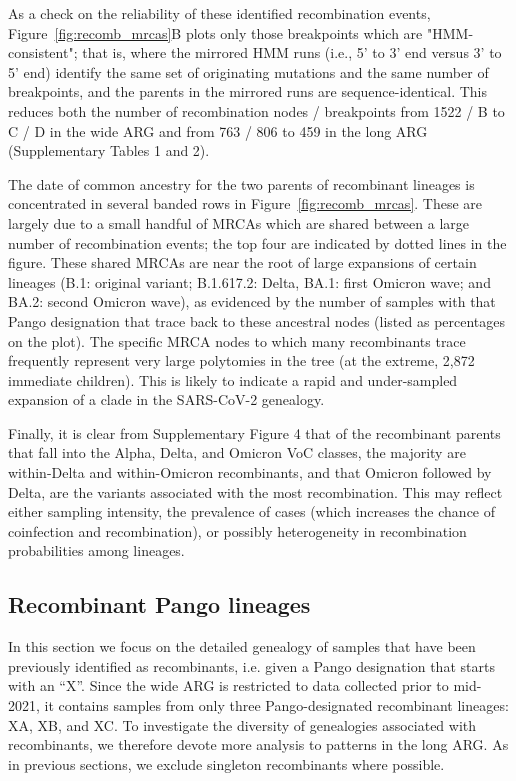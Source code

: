 \documentclass{article}
\begin{document}
As a check on the reliability of these identified recombination events, Figure~\ref{fig:recomb_mrcas}B  plots only those breakpoints which are "HMM-consistent"; that is, where the mirrored HMM runs (i.e., 5’ to 3’ end versus 3’ to 5’ end) identify the same set of originating mutations and the same number of breakpoints, and the parents in the mirrored runs are sequence-identical. This reduces both the number of recombination nodes / breakpoints from 1522 / B to C / D in the wide ARG and from 763 / 806 to 459 in the long ARG (Supplementary Tables 1 and 2).

The date of common ancestry for the two parents of recombinant lineages is concentrated in several banded rows in Figure~\ref{fig:recomb_mrcas}. These are largely due to a small handful of MRCAs which are shared between a large number of recombination events; the top four are indicated by dotted lines in the figure. These shared MRCAs are near the root of large expansions of certain lineages (B.1: original variant;  B.1.617.2: Delta, BA.1: first Omicron wave; and BA.2: second Omicron wave), as evidenced by the number of samples with that Pango designation that trace back to these ancestral nodes (listed as percentages on the plot). The specific MRCA nodes to which many recombinants trace frequently represent very large polytomies in the tree (at the extreme, 2,872 immediate children). This is likely to indicate a rapid and under-sampled expansion of a clade in the SARS-CoV-2 genealogy.

Finally, it is clear from Supplementary Figure 4 that of the recombinant parents that fall into the Alpha, Delta, and Omicron VoC classes, the majority are within-Delta and within-Omicron recombinants, and that Omicron followed by Delta, are the variants associated with the most recombination. This may reflect either sampling intensity, the prevalence of cases (which increases the chance of coinfection and recombination), or possibly heterogeneity in recombination probabilities among lineages.

\subsection{Recombinant Pango lineages}

In this section we focus on the detailed genealogy of samples that have been previously identified as recombinants, i.e. given a Pango designation that starts with an ``X''. Since the wide ARG is restricted to data collected prior to mid-2021, it contains samples from only three Pango-designated recombinant lineages: XA, XB, and XC. To investigate the diversity of genealogies associated with recombinants, we therefore devote more analysis to patterns in the long ARG. As in previous sections, we exclude singleton recombinants where possible.
\end{document}
